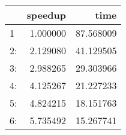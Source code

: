 \begin{tabular}{lrr}
\toprule
{} &   speedup &       time \\
\midrule
1  &  1.000000 &  87.568009 \\
2: &  2.129080 &  41.129505 \\
3: &  2.988265 &  29.303966 \\
4: &  4.125267 &  21.227233 \\
5: &  4.824215 &  18.151763 \\
6: &  5.735492 &  15.267741 \\
\bottomrule
\end{tabular}
